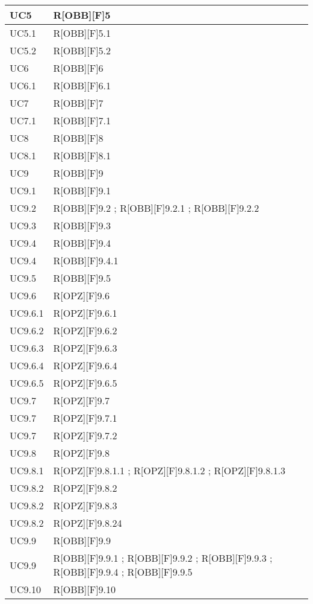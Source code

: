 	\begin{table}[H]
		\centering
		\begin{tabular}{|p{}|p{}|}
			\midrule

			UC5 & R[OBB][F]5 \\ \midrule
			UC5.1 & R[OBB][F]5.1 \\ \midrule
			UC5.2 & R[OBB][F]5.2 \\ \midrule
			UC6 & R[OBB][F]6 \\ \midrule
			UC6.1 & R[OBB][F]6.1 \\ \midrule
			UC7 & R[OBB][F]7 \\ \midrule
			UC7.1 & R[OBB][F]7.1 \\ \midrule
			UC8 & R[OBB][F]8 \\ \midrule
			UC8.1 & R[OBB][F]8.1 \\ \midrule
			UC9 & R[OBB][F]9 \\ \midrule
			UC9.1 & R[OBB][F]9.1 \\ \midrule
			UC9.2 & R[OBB][F]9.2 ; R[OBB][F]9.2.1 ; R[OBB][F]9.2.2 \\ \midrule
			UC9.3 & R[OBB][F]9.3 \\ \midrule
			UC9.4 & R[OBB][F]9.4 \\ \midrule
			UC9.4 & R[OBB][F]9.4.1 \\ \midrule
			UC9.5 & R[OBB][F]9.5 \\ \midrule
			UC9.6 & R[OPZ][F]9.6 \\ \midrule
			UC9.6.1 & R[OPZ][F]9.6.1 \\ \midrule
			UC9.6.2 & R[OPZ][F]9.6.2 \\ \midrule
			UC9.6.3 & R[OPZ][F]9.6.3 \\ \midrule
			UC9.6.4 & R[OPZ][F]9.6.4 \\ \midrule
			UC9.6.5 & R[OPZ][F]9.6.5 \\ \midrule
			UC9.7 & R[OPZ][F]9.7 \\ \midrule
			UC9.7 & R[OPZ][F]9.7.1 \\ \midrule
			UC9.7 & R[OPZ][F]9.7.2 \\ \midrule
			UC9.8 & R[OPZ][F]9.8 \\ \midrule
			UC9.8.1 & R[OPZ][F]9.8.1.1 ; R[OPZ][F]9.8.1.2 ; R[OPZ][F]9.8.1.3 \\ \midrule
			UC9.8.2 & R[OPZ][F]9.8.2 \\ \midrule
			UC9.8.2 & R[OPZ][F]9.8.3 \\ \midrule
			UC9.8.2 & R[OPZ][F]9.8.24 \\ \midrule
			UC9.9 & R[OBB][F]9.9 \\ \midrule
			UC9.9 & R[OBB][F]9.9.1 ; R[OBB][F]9.9.2 ; R[OBB][F]9.9.3 ; R[OBB][F]9.9.4 ; R[OBB][F]9.9.5 \\ \midrule
			UC9.10 & R[OBB][F]9.10 \\ \midrule

		\end{tabular}
	\end{table}
	\newpage
	
